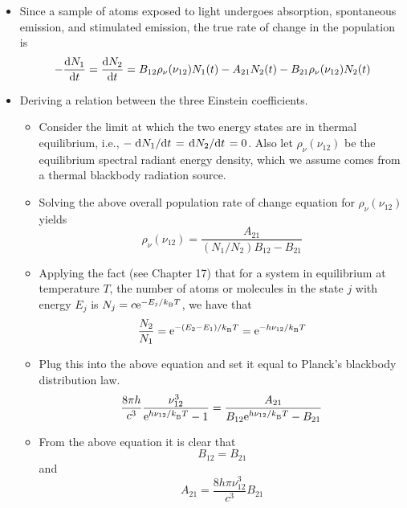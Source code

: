 \documentclass[../notes.tex]{subfiles}
\begin{document}
\begin{itemize}
\begin{itemize}
\begin{itemize}
        \end{itemize}
    \end{itemize}
    \item Since a sample of atoms exposed to light undergoes absorption, spontaneous emission, and stimulated emission, the true rate of change in the population is
    \begin{equation*}
        -\dv{N_1}{t} = \dv{N_2}{t} = B_{12}\rho_\nu(\nu_{12})N_1(t)-A_{21}N_2(t)-B_{21}\rho_\nu(\nu_{12})N_2(t)
    \end{equation*}
    \item Deriving a relation between the three Einstein coefficients.
    \begin{itemize}
        \item Consider the limit at which the two energy states are in thermal equilibrium, i.e., $-\dv*{N_1}{t}=\dv*{N_2}{t}=0$. Also let $\rho_\nu(\nu_{12})$ be the equilibrium spectral radiant energy density, which we assume comes from a thermal blackbody radiation source.
        \item Solving the above overall population rate of change equation for $\rho_\nu(\nu_{12})$ yields
        \begin{equation*}
            \rho_\nu(\nu_{12}) = \frac{A_{21}}{(N_1/N_2)B_{12}-B_{21}}
        \end{equation*}
        \item Applying the fact (see Chapter 17) that for a system in equilibrium at temperature $T$, the number of atoms or molecules in the state $j$ with energy $E_j$ is $N_j=c\e[-E_j/\kB T]$, we have that
        \begin{equation*}
            \frac{N_2}{N_1} = \e[-(E_2-E_1)/\kB T] = \e[-h\nu_{12}/\kB T]
        \end{equation*}
        \item Plug this into the above equation and set it equal to Planck's blackbody distribution law.
        \begin{equation*}
            \frac{8\pi h}{c^3}\frac{\nu_{12}^3}{\e[h\nu_{12}/\kB T]-1} = \frac{A_{21}}{B_{12}\e[h\nu_{12}/\kB T]-B_{21}}
        \end{equation*}
        \item From the above equation it is clear that
        \begin{equation*}
            B_{12} = B_{21}
        \end{equation*}
        and
        \begin{equation*}
            A_{21} = \frac{8h\pi\nu_{12}^3}{c^3}B_{21}

\end{equation*}
\end{itemize}
\end{itemize}
\end{document}
